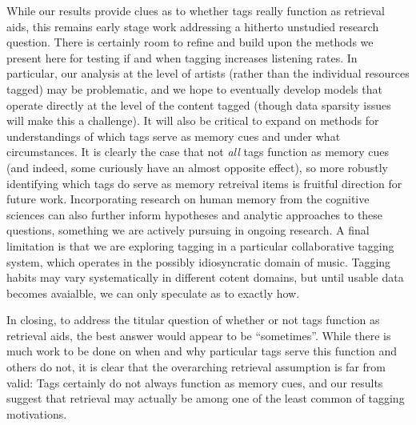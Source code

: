 While our results provide clues as to whether tags really function as retrieval aids, this remains early stage work addressing a hitherto unstudied research question. There is certainly room to refine and build upon the methods we present here for testing if and when tagging increases listening rates. In particular, our analysis at the level of artists (rather than the individual resources tagged) may be problematic, and we hope to eventually develop models that operate directly at the level of the content tagged (though data sparsity issues will make this a challenge). It will also be critical to expand on methods for understandings of which tags serve as memory cues and under what circumstances. It is clearly the case that not \emph{all} tags function as memory cues (and indeed, some curiously have an almost opposite effect), so more robustly identifying which tags do serve as memory retreival items is fruitful direction for future work. Incorporating research on human memory from the cognitive sciences can also further inform hypotheses and analytic approaches to these questions, something we are actively pursuing in ongoing research. A final limitation is that we are exploring tagging in a particular collaborative tagging system, which operates in the possibly idiosyncratic domain of music. Tagging habits may vary systematically in different cotent domains, but until usable data becomes avaialble, we can only speculate as to exactly how.

In closing, to address the titular question of whether or not tags function as retrieval aids, the best answer would appear to be ``sometimes''. While there is much work to be done on when and why particular tags serve this function and others do not, it is clear that the overarching retrieval assumption is far from valid: Tags certainly do not always function as memory cues, and our results suggest that retrieval may actually be among one of the least common of tagging motivations. 

